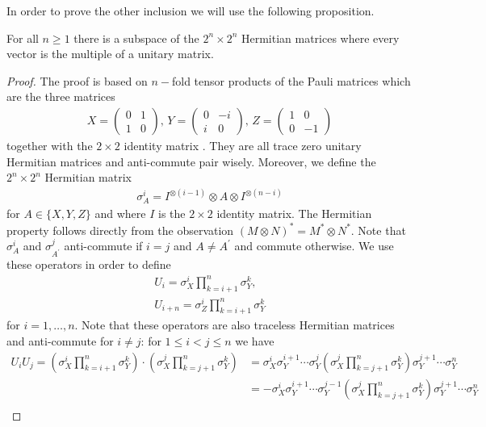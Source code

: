 \noindent In order to prove the other inclusion we will use the following proposition. 
\begin{prop} \label{PauliProp}
For all $ n \ge 1 $ there is a subspace of the $ 2^n \times 2^n $ Hermitian matrices where every vector is the multiple of a unitary matrix. 
\end{prop}
\begin{proof}
The proof is based on $ n- $fold tensor products of the Pauli matrices which are the three matrices 
\begin{align*}
X = \begin{pmatrix}
0 & 1 \\ 1 & 0
\end{pmatrix}, \, Y = \begin{pmatrix}
0 & -i \\ i & 0
\end{pmatrix}, \, Z = \begin{pmatrix}
1 & 0 \\ 0 & -1
\end{pmatrix}
\end{align*}
together with the $ 2 \times 2 $ identity matrix .
They are all trace zero unitary Hermitian matrices and anti-commute pair wisely. 
Moreover, we define the $ 2^n \times 2^n $ Hermitian matrix 
\begin{align*}
\sigma_A^i = I^{\otimes (i-1)} \otimes A \otimes I^{\otimes (n-i)}
\end{align*}
for $ A \in \{ X,Y,Z \}$ and where $ I $ is the $ 2 \times 2 $ identity matrix. The Hermitian property follows directly from the observation $ (M \otimes N)^* = M^* \otimes N^* $.
Note that $ \sigma_A^i $ and $ \sigma_{A^{\prime}}^j $ anti-commute if $ i = j $ and $ A \neq A^{\prime} $ and commute otherwise. We use these operators in order to define 
\begin{align*}
U_i = \sigma_X^i \prod_{k = i+1}^{n}\sigma_Y^k, \\
U_{i+n} = \sigma_Z^i \prod_{k = i+1}^n \sigma_Y^k
\end{align*}
for $ i = 1,\hdots,n $. Note that these operators are also traceless Hermitian matrices and anti-commute for $ i \neq j $:    
for $ 1 \le i < j  \le n$ we have 
\begin{align*}
U_iU_j = (\sigma_X^i \prod_{k = i+1}^{n}\sigma_Y^k) \cdot( \sigma_X^j \prod_{k = j+1}^{n}\sigma_Y^k) &= \sigma_X^i \sigma_Y^{i+1} \cdots \sigma_Y^j ( \sigma_X^j \prod_{k = j+1}^{n}\sigma_Y^k) \sigma_Y^{j+1} \cdots \sigma_Y^n \\
&= - \sigma_X^i \sigma_Y^{i+1} \cdots \sigma_Y^{j-1} ( \sigma_X^j \prod_{k = j+1}^{n}\sigma_Y^k) \sigma_Y^{j+1} \cdots \sigma_Y^n  \\

\end{align*}
\end{proof}

